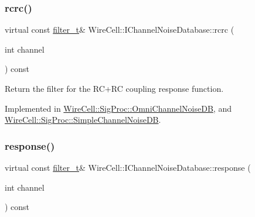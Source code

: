 \mbox{\label{class_wire_cell_1_1_i_channel_noise_database_a8f9fa5547062c23f689fde9bb810361b}} 
\subsubsection{\texorpdfstring{rcrc()}{rcrc()}}
{\footnotesize\ttfamily virtual const \hyperlink{class_wire_cell_1_1_i_channel_noise_database_a0acbae29743542eb1c652f7a56e692f5}{filter\+\_\+t}\& Wire\+Cell\+::\+I\+Channel\+Noise\+Database\+::rcrc (\begin{DoxyParamCaption}\item[{int}]{channel }\end{DoxyParamCaption}) const\hspace{0.3cm}{\ttfamily [pure virtual]}}



Return the filter for the R\+C+\+RC coupling response function. 



Implemented in \hyperlink{class_wire_cell_1_1_sig_proc_1_1_omni_channel_noise_d_b_a0155aba843a5a04966ffcfe556b207f8}{Wire\+Cell\+::\+Sig\+Proc\+::\+Omni\+Channel\+Noise\+DB}, and \hyperlink{class_wire_cell_1_1_sig_proc_1_1_simple_channel_noise_d_b_a9a4481bf485a0aaa4903094463f4e2b3}{Wire\+Cell\+::\+Sig\+Proc\+::\+Simple\+Channel\+Noise\+DB}.

\mbox{\label{class_wire_cell_1_1_i_channel_noise_database_ad3c42f59a26e8a8e115199a894d881da}} 
\subsubsection{\texorpdfstring{response()}{response()}}
{\footnotesize\ttfamily virtual const \hyperlink{class_wire_cell_1_1_i_channel_noise_database_a0acbae29743542eb1c652f7a56e692f5}{filter\+\_\+t}\& Wire\+Cell\+::\+I\+Channel\+Noise\+Database\+::response (\begin{DoxyParamCaption}\item[{int}]{channel }\end{DoxyParamCaption}) const\hspace{0.3cm}{\ttfamily [pure virtual]}}



